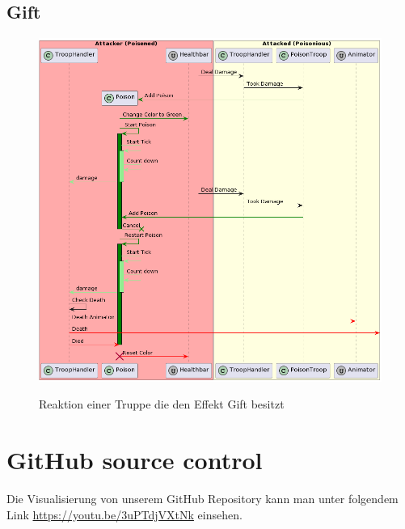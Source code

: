 \subsection{Gift}
\begin{figure}[H]
    \centering
    \includegraphics[width=15cm]{resources/Poison.png} \\
    \caption{Reaktion einer Truppe die den Effekt Gift besitzt}
\end{figure}


\section{GitHub source control}
Die Visualisierung von unserem GitHub Repository kann man unter folgendem Link \url{https://youtu.be/3uPTdjVXtNk} einsehen.
